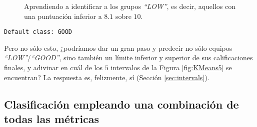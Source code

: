 \begin{figure}[H]
\centering
{}
\caption{Aprendiendo a identificar a los grupos \emph{``LOW''}, es decir, aquellos con una puntuación inferior a $8.1$ sobre $10$.}
\label{fig:cmbegin1}
\end{figure}

\begin{tcolorbox}[title=Reglas de clasificación para identificar grupos de tipo \emph{``LOW''}.]
  \makeatletter
  \makeatother
\begin{multicols}{2}
    \begin{verbatim}
Default class: GOOD
    \end{verbatim}
  \end{multicols}
\label{rulesbegin1}
\end{tcolorbox}

Pero no sólo esto, ¿podríamos dar un gran paso y predecir no sólo equipos \emph{``LOW''}/\emph{``GOOD''}, sino también un límite inferior y superior de sus calificaciones finales, y adivinar en cuál de los $5$ intervalos de la Figura \ref{fig:KMeans5} se encuentran? La respuesta es, felizmente, sí (Sección \ref{sec:intervals}).

\subsection{Clasificación empleando una combinación de todas las métricas}

